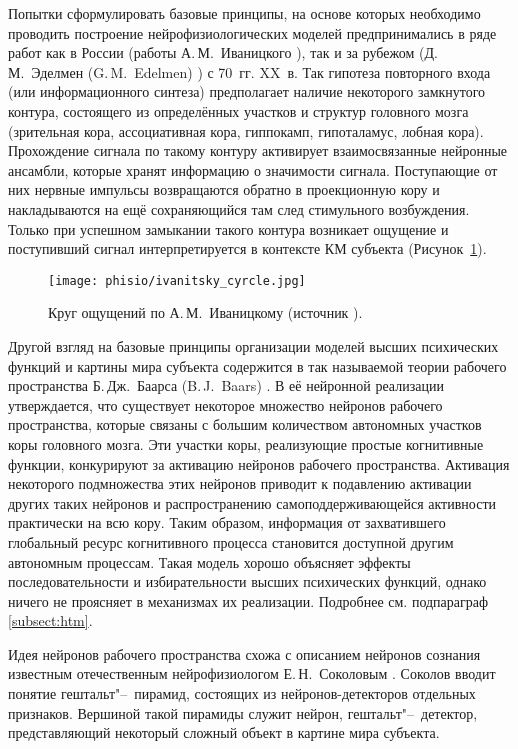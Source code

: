 Попытки сформулировать базовые принципы, на основе которых необходимо проводить построение нейрофизиологических моделей предпринимались в ряде работ как в России (работы А.\,М.~Иваницкого \cite{Ivanitsky1996,IvanitskyE1996}), так и за рубежом (Д.\,М.~Эделмен (G.\,M.~Edelmen) \cite{Edelmen1981}) с 70~гг. XX~в. Так гипотеза повторного входа (или информационного синтеза) предполагает наличие некоторого замкнутого контура, состоящего из определённых участков и структур головного мозга (зрительная кора, ассоциативная кора, гиппокамп, гипоталамус, лобная кора). Прохождение сигнала по такому контуру активирует взаимосвязанные нейронные ансамбли, которые хранят информацию о значимости сигнала. Поступающие от них нервные импульсы возвращаются обратно в проекционную кору и накладываются на ещё сохраняющийся там след стимульного возбуждения. Только при успешном замыкании такого контура возникает ощущение и поступивший сигнал интерпретируется в контексте КМ субъекта (Рисунок~\ref{fg:ivanitsky_cyrcle}). 

\begin{figure}[h]
	\centering	
	\texttt{[image: phisio/ivanitsky\_cyrcle.jpg]}
	\caption{Круг ощущений по А.\,М.~Иваницкому (источник \cite{Ivanitsky1996}).}
	\label{fg:ivanitsky_cyrcle}
\end{figure}

Другой взгляд на базовые принципы организации моделей высших психических функций и картины мира субъекта содержится в так называемой теории рабочего пространства Б.\,Дж.~Баарса (B.\,J.~Baars) \cite{Baars2005}. В её нейронной реализации \cite{Dehaene2003} утверждается, что существует некоторое множество нейронов рабочего пространства, которые связаны с большим количеством автономных участков коры головного мозга. Эти участки коры, реализующие простые когнитивные функции, конкурируют за активацию нейронов рабочего пространства. Активация некоторого подмножества этих нейронов приводит к подавлению активации других таких нейронов и распространению самоподдерживающейся активности практически на всю кору. Таким образом, информация от захватившего глобальный ресурс когнитивного процесса становится доступной другим автономным процессам. Такая модель хорошо объясняет эффекты последовательности и избирательности высших психических функций, однако ничего не проясняет в механизмах их реализации. Подробнее см. подпараграф \ref{subsect:htm}.

Идея нейронов рабочего пространства схожа с описанием нейронов сознания известным отечественным нейрофизиологом Е.\,Н.~Соколовым \cite{Sokolov2004}. Соколов вводит понятие гештальт"--~пирамид, состоящих из нейронов-детекторов отдельных признаков. Вершиной такой пирамиды служит нейрон, гештальт"--~детектор, представляющий некоторый сложный объект в картине мира субъекта.


